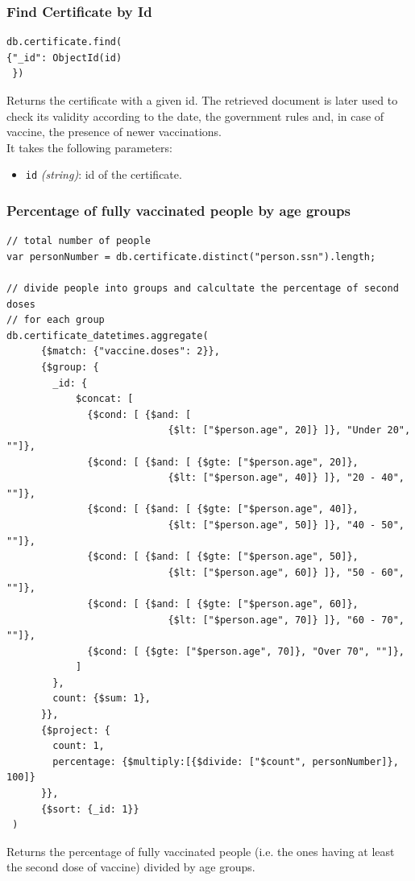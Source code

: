 \documentclass[12pt, a4paper]{article}
\begin{document}
\subsubsection{Find Certificate by Id}
\begin{tcolorbox}[fontupper=\scriptsize]
    \begin{verbatim}
db.certificate.find(
{"_id": ObjectId(id)
 })
    \end{verbatim}
\end{tcolorbox}

\noindent %
Returns the certificate with a given id. The retrieved document is later used to check 
its validity according to the date, the government rules and, in case of vaccine, the 
presence of newer vaccinations. \\
It takes the following parameters:
\begin{itemize}
    \item \texttt{id} \emph{(string)}: id of the certificate.
\end{itemize}

\subsubsection{Percentage of fully vaccinated people by age groups}
\begin{tcolorbox}[fontupper=\scriptsize]
    \begin{verbatim}
// total number of people
var personNumber = db.certificate.distinct("person.ssn").length;

// divide people into groups and calcultate the percentage of second doses 
// for each group 
db.certificate_datetimes.aggregate(
      {$match: {"vaccine.doses": 2}},
      {$group: {
        _id: {
            $concat: [
              {$cond: [ {$and: [ 
                            {$lt: ["$person.age", 20]} ]}, "Under 20", ""]},
              {$cond: [ {$and: [ {$gte: ["$person.age", 20]}, 
                            {$lt: ["$person.age", 40]} ]}, "20 - 40", ""]},
              {$cond: [ {$and: [ {$gte: ["$person.age", 40]}, 
                            {$lt: ["$person.age", 50]} ]}, "40 - 50", ""]},
              {$cond: [ {$and: [ {$gte: ["$person.age", 50]}, 
                            {$lt: ["$person.age", 60]} ]}, "50 - 60", ""]},
              {$cond: [ {$and: [ {$gte: ["$person.age", 60]}, 
                            {$lt: ["$person.age", 70]} ]}, "60 - 70", ""]},
              {$cond: [ {$gte: ["$person.age", 70]}, "Over 70", ""]},
            ]
        },
        count: {$sum: 1},
      }},
      {$project: {
        count: 1,
        percentage: {$multiply:[{$divide: ["$count", personNumber]}, 100]}
      }},
      {$sort: {_id: 1}}
 )
    \end{verbatim}
\end{tcolorbox}
\noindent 
Returns the percentage of fully vaccinated people (i.e. the ones having at least the 
second dose of vaccine) divided by age groups.
\end{document}
